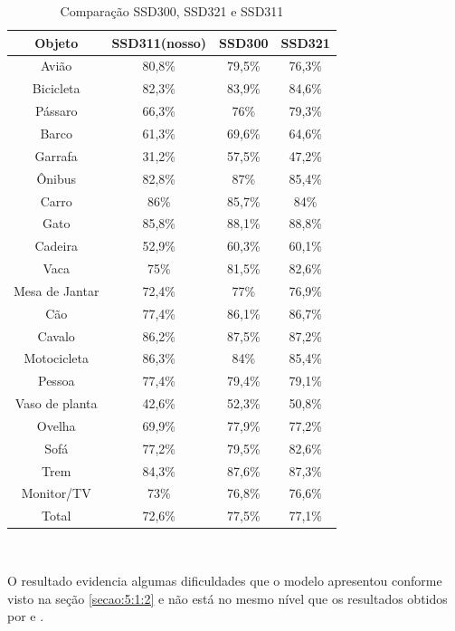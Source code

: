   \begin{table}[H]
    \centering
    \footnotesize
    \setlength{\abovecaptionskip}{0pt}
    \setlength{\belowcaptionskip}{0pt}
    \caption[Resultados SSD]{Comparação SSD300, SSD321 e SSD311}
    \label{tab:classesNas}
    \begin{tabular}{c|c|c|c}
	Objeto &	SSD311(nosso) & SSD300 & SSD321 \\ 
	\hline 
 	Avião 			& 80,8\%	& 79,5\% 	& 76,3\% \\ 
	Bicicleta 		& 82,3\%	& 83,9\% 	& 84,6\%  \\ 
	Pássaro 		& 66,3\%	& 76\%  	& 79,3\%  \\
	Barco 			& 61,3\%	& 69,6\% 	& 64,6\%  \\ 
	Garrafa 		& 31,2\%	& 57,5\%  	& 47,2\%  \\ 
	Ônibus 			& 82,8\%	& 87\%	 	& 85,4\%  \\
	Carro 			& 86\%		& 85,7\%  	& 84\%  \\ 
	Gato 			& 85,8\%	& 88,1\%  	& 88,8\%  \\
	Cadeira 		& 52,9\%	& 60,3\%  	& 60,1\%  \\ 
	Vaca 			& 75\% 		& 81,5\% 	& 82,6\%  \\
	Mesa de Jantar 	& 72,4\% 	& 77\%  	& 76,9\%  \\ 
	Cão 			& 77,4\% 	& 86,1\% 	& 86,7\%  \\
	Cavalo 			& 86,2\% 	& 87,5\% 	& 87,2\%  \\ 
	Motocicleta 	& 86,3\% 	& 84\%  	& 85,4\%  \\
	Pessoa 			& 77,4\% 	& 79,4\%  	& 79,1\%  \\ 
	Vaso de planta 	& 42,6\% 	& 52,3\%  	& 50,8\%  \\
	Ovelha 			& 69,9\%	& 77,9\%  	& 77,2\%  \\
	Sofá 			& 77,2\% 	& 79,5\%  	& 82,6\%  \\
	Trem 			& 84,3\% 	& 87,6\%  	& 87,3\%  \\
	Monitor/TV 		& 73\% 		& 76,8\%  	& 76,6\%  \\ 
	Total 			& 72,6\% 	& 77,5\%  	& 77,1\%  \\
    \end{tabular}
    \\
  \end{table}

O resultado evidencia algumas dificuldades que o modelo apresentou conforme visto na seção \ref{secao:5:1:2} e não está no mesmo nível que os resultados obtidos por  e .

